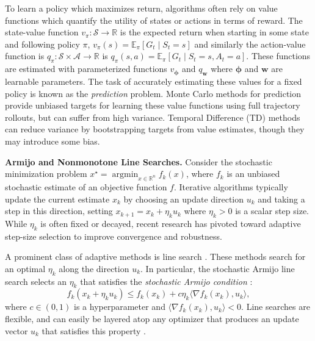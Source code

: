 \documentclass{article}
\newcommand{\xstar}{x^\star}
\newcommand{\xAt}[1]{x_{#1}}
\newcommand{\update}{u}
\newcommand{\updateAt}[1]{\update_{#1}}
\newcommand{\stepSize}{\eta}
\newcommand{\stepSizeAt}[1]{\stepSize_{#1}}
\newcommand{\inner}[2]{\langle #1, #2 \rangle}
\newcommand{\stateSpace}{\mathscr{S}}
\newcommand{\actionSpace}{\mathscr{A}}
\newcommand{\q}{q}
\newcommand{\qfn}{\q_{\pi}}
\newcommand{\qparams}{{\bm w}}
\newcommand{\qparam}{\q_\qparams}
\renewcommand{\v}{v}
\newcommand{\vfn}{\v_{\pi}}
\newcommand{\vparams}{{\bm \phi}}
\newcommand{\vparam}{\v_\vparams}
\newcommand{\RR}{\mathbb{R}}
\DeclareMathOperator{\argmin}{argmin}
\begin{document}
To learn a policy which maximizes return, algorithms often rely on value functions which quantify the utility of states or
actions in terms of reward. The state-value function $\vfn: \stateSpace \to \RR$
is the expected return when starting in some state and following policy $\pi$, 
$\vfn(s) = \mathbb{E}_\pi \left[ G_t \mid S_t = s \right] $
and
similarly the action-value function is $\qfn: \stateSpace \times \actionSpace \to \RR$ 
is
$ \qfn(s, a) = \mathbb{E}_\pi \left[ G_t \mid S_t = s,
A_t = a \right] $. 
These functions are estimated with parameterized functions $\vparam$ and $\qparam$ where $\vparams$ and $\qparams$ are learnable parameters.
The task of accurately estimating these values for a fixed policy is known as the \textit{prediction} problem. Monte Carlo
methods for prediction provide unbiased targets for learning these value functions using full trajectory rollouts, but
can suffer from high variance. Temporal Difference (TD) methods can reduce variance by
bootstrapping targets from value estimates, though they may introduce some bias.

\textbf{Armijo and Nonmonotone Line Searches.}
Consider the stochastic minimization problem  $\xstar = \argmin_{x \in
\mathbb{R}^n} f_k(x)$, where $f_k$ is an unbiased stochastic estimate of an objective function $f$. Iterative algorithms typically update the current estimate $\xAt{k}$ by choosing an
update direction $\updateAt{k}$ and taking a step in this direction, setting $\xAt{k+1} = \xAt{k} + \stepSizeAt{k} \updateAt{k}$
where $\stepSizeAt{k} > 0$ is a scalar step size. While $\stepSizeAt{k}$ is often fixed or decayed, recent research has pivoted toward adaptive step-size selection to improve convergence and robustness.

A prominent class of adaptive methods is line search \citep{nocedal2006numerical,armijo1966minimization,vaswani2019painless,vaswani2025armijo,galli2023monotone,fox2024nonmonotone,fox2024glocal}. These methods search for an optimal $\stepSizeAt{k}$ along the direction $\updateAt{k}$. In particular, the stochastic Armijo line
search selects an $\stepSizeAt{k}$ that satisfies the \textit{stochastic Armijo condition} \citep{vaswani2019painless}:
%
\begin{equation}
        f_k(\xAt{k} + \stepSizeAt{k} \updateAt{k}) \le f_k(\xAt{k}) + c \stepSizeAt{k} \inner{\nabla f_k(\xAt{k})}{\updateAt{k}},
    \label{eq:armijo_condition}
\end{equation}
%
where $c \in (0, 1)$ is a hyperparameter and $\inner{\nabla f_k(\xAt{k})}{\updateAt{k}} < 0$. Line searches are flexible, and can easily be layered atop any optimizer that produces an update vector $\updateAt{k}$ that satisfies this property \citep{nocedal2006numerical,vaswani2025armijo,shea2024so}. 
\end{document}
